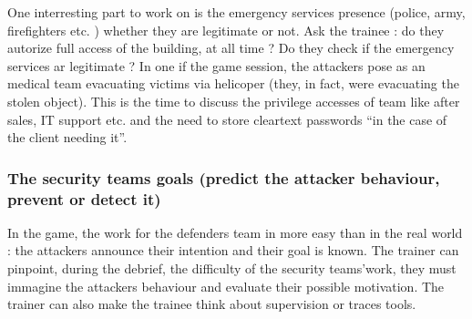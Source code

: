 \documentclass[11pt]{article} %
\begin{document}
One interresting part to work on is the emergency services presence (police, 
army, firefighters etc. ) whether they are legitimate or not. Ask the trainee : 
do they autorize full access of the building, at all time ? Do they check if the 
emergency services ar legitimate ? In one if the game session, the attackers
pose as an medical team evacuating victims via helicoper (they, in fact, were 
evacuating the stolen object). This is the time to discuss the privilege accesses 
of team like after sales, IT support etc.  and the need to store cleartext passwords 
``in the case of the client needing it''.

\subsubsection{The security teams goals (predict the attacker behaviour, 
prevent or detect it)}
In the game, the work for the defenders team in more easy than in the real world : 
the attackers announce their intention and their goal is known. The trainer can pinpoint, 
during the debrief, the difficulty of the security teams'work, they must immagine the 
attackers behaviour and evaluate their possible motivation.
The trainer can also make the trainee think about supervision or traces tools. 
\end{document}
